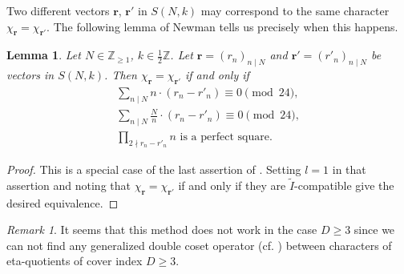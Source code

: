 \documentclass[12pt]{amsart}
\numberwithin{equation}{section}
\theoremstyle{plain}
\newtheorem{lemm}[thm]{Lemma}
\theoremstyle{definition}
\theoremstyle{remark}
\newtheorem{rema}[thm]{Remark}
\newcommand\numZ{\mathbb{Z}}
\newcommand\numgeq[2]{\mathbb{#1}_{\geq #2}}
\begin{document}
Two different vectors $\mathbf{r}$, $\mathbf{r}'$ in $S(N,k)$ may correspond to the same character $\chi_{\mathbf{r}}=\chi_{\mathbf{r}'}$. The following lemma of Newman \cite{New59} tells us precisely when this happens.
\begin{lemm}
\label{lemm:whenCharSame}
Let $N\in\numgeq{Z}{1}$, $k\in\frac{1}{2}\numZ$. Let $\mathbf{r}=(r_n)_{n\mid N}$ and $\mathbf{r}'=(r'_n)_{n\mid N}$ be vectors in $S(N,k)$. Then $\chi_{\mathbf{r}}=\chi_{\mathbf{r}'}$ if and only if
\begin{gather*}
\sum_{n\mid N}n\cdot(r_n-r'_n)\equiv0\pmod{24},\\
\sum_{n\mid N}\frac{N}{n}\cdot(r_n-r'_n)\equiv0\pmod{24},\\
\prod_{2\nmid r_n-r'_n}n \text{ is a perfect square}.
\end{gather*}
\end{lemm}
\begin{proof}
This is a special case of the last assertion of \cite[Theorem 3.9]{ZZ23}. Setting $l=1$ in that assertion and noting that $\chi_{\mathbf{r}}=\chi_{\mathbf{r}'}$ if and only if they are $\widetilde{I}$-compatible give the desired equivalence.
\end{proof}
\begin{rema}
It seems that this method does not work in the case $D\geq3$ since we can not find any generalized double coset operator (cf. \cite[Definition 1]{ZZ23}) between characters of eta-quotients of cover index $D\geq3$.
\end{rema}
\end{document}
